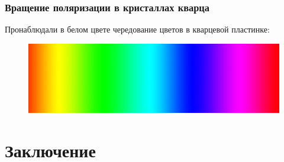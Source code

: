 \subsubsection{Вращение поляризации в кристаллах кварца}

Пронаблюдали в белом цвете чередование цветов в кварцевой пластинке:

\begin{figure}[H]
	\centering
	\includegraphics[width=\textwidth]{images/RADUGA.jpg}
	\caption{}
	\label{fig:figure6}
\end{figure}




\newpage
\section{Заключение}

